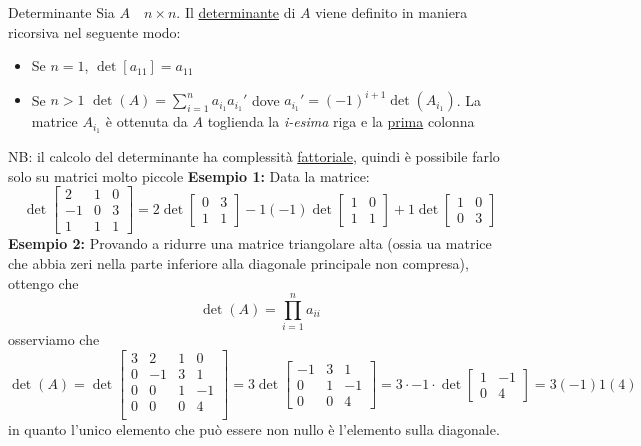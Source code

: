 \begin{definizione}{Determinante}
	Sia $A \quad n \times n$. Il  \underline{determinante} di $A$  viene definito in maniera ricorsiva nel seguente modo:
	\begin{itemize}
		\item Se $n=1$, $\det\left[ a_{11} \right]  =a_{11}$
		\item Se $n >1$ $\det\left( A \right) = \sum_{i=1}^{n} a_{i_1}a_{i_1}'$ dove $a_{i_1}'= \left( -1 \right) ^{i+1} \det \left( A_{i_1} \right) $. La matrice $A_{i_1}$ è ottenuta da $A$ toglienda la \textit{i-esima} riga e la \underline{prima} colonna
	\end{itemize}
\end{definizione}
NB: il calcolo del determinante ha complessità \underline{fattoriale}, quindi è possibile farlo solo su matrici molto piccole
\vskip3mm
\textbf{Esempio 1:}
Data la matrice:
\[
	\det
	\begin{bmatrix}
		2  & 1 & 0 \\
		-1 & 0 & 3 \\
		1  & 1 & 1
	\end{bmatrix}
	=2 \det\begin{bmatrix} 0&3 \\1 & 1  \end{bmatrix} -1\left( -1 \right) \det\begin{bmatrix} 1&0\\1 &1 \end{bmatrix} +1\det\begin{bmatrix} 1&0\\0&3 \end{bmatrix}
\]
\textbf{Esempio 2:}
Provando a ridurre una matrice triangolare alta (ossia ua matrice che abbia zeri nella parte inferiore alla diagonale principale non compresa), ottengo che
\[
	\det(A) = \prod_{i=1}^{n}  a_{ii}
\]
osserviamo che
\[
	\det\left( A \right) = \det
	\begin{bmatrix}
		3 & 2  & 1 & 0  \\
		0 & -1 & 3 & 1  \\
		0 & 0  & 1 & -1 \\
		0 & 0  & 0 & 4  \\
	\end{bmatrix}
	= 3 \det
	\begin{bmatrix}
		-1 & 3 & 1  \\
		0  & 1 & -1 \\
		0  & 0 & 4
	\end{bmatrix}
	=3 \cdot -1 \cdot \det
	\begin{bmatrix}
		1 & -1 \\
		0 & 4
	\end{bmatrix}
	= 3 \left( -1 \right) 1\left( 4 \right)
\]
in quanto l'unico elemento che può essere non nullo è l'elemento sulla diagonale.
